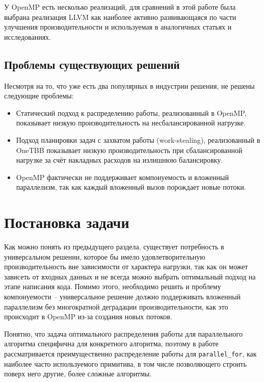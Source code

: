 \documentclass[times,specification,annotation]{itmo-student-thesis}
\begin{document}
У OpenMP есть несколько реализаций, для сравнений в этой работе была выбрана реализация LLVM как наиболее активно развивающаяся по части улучшения производительности и используемая в аналогичных статьях и исследованиях. ~\cite{lbomp}

\subsection{Проблемы существующих решений}
Несмотря на то, что уже есть два популярных в индустрии решения, не решены следующие проблемы:
\begin{itemize}
    \item Статический подход к распределению работы, реализованный в OpenMP, показывает низкую производительность на несбалансированной нагрузке.
    \item Подход планировки задач с захватом работы (work-stealing), реализованный в OneTBB показывает низкую производительность при сбалансированной нагрузке за счёт накладных расходов на излишнюю балансировку.
    \item OpenMP фактически не поддерживает компонуемость и вложенный параллелизм, так как каждый вложенный вызов порождает новые потоки.
\end{itemize}


\finishrelatedwork
\section{Постановка задачи}
Как можно понять из предыдущего раздела, существует потребность в универсальном решении, которое бы имело удовлетворительную производительность вне зависимости от характера нагрузки, так как он может зависеть от входных данных и не всегда можно выбрать оптимальный подход на этапе написания кода. Помимо этого, необходимо решить и проблему компонуемости -- универсальное решение должно поддерживать вложенный параллелизм без многократной деградации производительности, как это происходит в OpenMP из-за создания новых потоков.

Понятно, что задача оптимального распределения работы для параллельного алгоритма специфична для конкретного алгоритма, поэтому в работе рассматривается преимущественно распределение работы для \texttt{parallel\_for}, как наиболее часто используемого примитива, в том числе позволяющего строить поверх него другие, более сложные алгоритмы.
\end{document}
